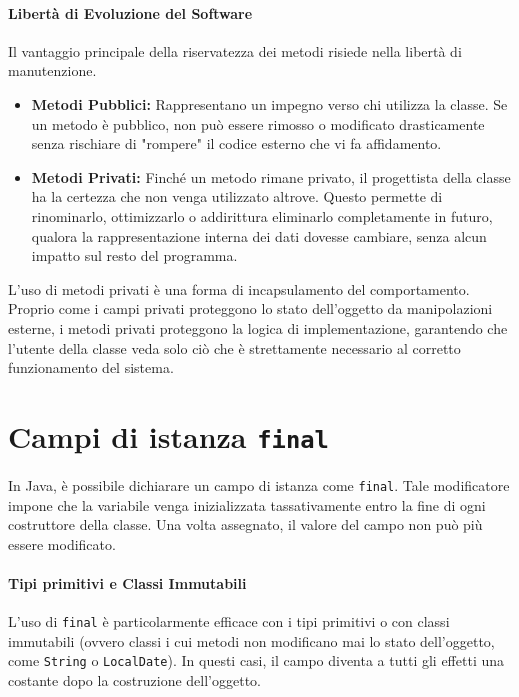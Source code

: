 \paragraph{Libertà di Evoluzione del Software}
Il vantaggio principale della riservatezza dei metodi risiede nella libertà di manutenzione. 
\begin{itemize}
    \item \textbf{Metodi Pubblici:} Rappresentano un impegno verso chi utilizza la classe. Se un metodo è pubblico, non può essere rimosso o modificato drasticamente senza rischiare di "rompere" il codice esterno che vi fa affidamento.
    \item \textbf{Metodi Privati:} Finché un metodo rimane privato, il progettista della classe ha la certezza che non venga utilizzato altrove. Questo permette di rinominarlo, ottimizzarlo o addirittura eliminarlo completamente in futuro, qualora la rappresentazione interna dei dati dovesse cambiare, senza alcun impatto sul resto del programma.
\end{itemize}



\begin{observation}
    L'uso di metodi privati è una forma di incapsulamento del comportamento. Proprio come i campi privati proteggono lo stato dell'oggetto da manipolazioni esterne, i metodi privati proteggono la logica di implementazione, garantendo che l'utente della classe veda solo ciò che è strettamente necessario al corretto funzionamento del sistema.
\end{observation}

\section{Campi di istanza \texttt{final}}

In Java, è possibile dichiarare un campo di istanza come \texttt{final}. Tale modificatore impone che la variabile venga inizializzata tassativamente entro la fine di ogni costruttore della classe. Una volta assegnato, il valore del campo non può più essere modificato.

\paragraph{Tipi primitivi e Classi Immutabili}
L'uso di \texttt{final} è particolarmente efficace con i tipi primitivi o con classi immutabili (ovvero classi i cui metodi non modificano mai lo stato dell'oggetto, come \texttt{String} o \texttt{LocalDate}). In questi casi, il campo diventa a tutti gli effetti una costante dopo la costruzione dell'oggetto.

